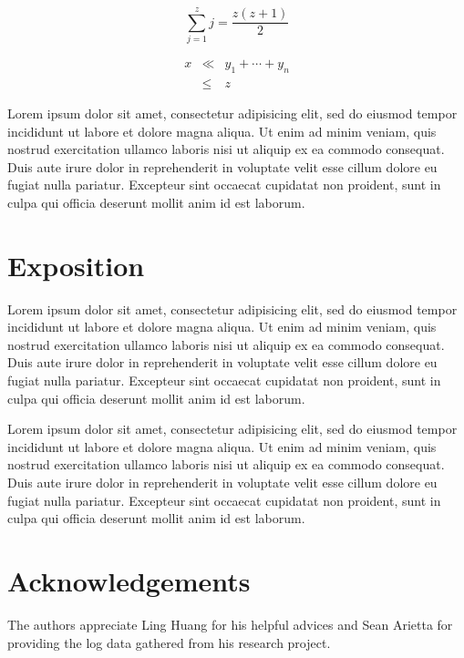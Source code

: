 \documentclass[conference]{style/acmsiggraph}
\begin{document}
\begin{equation}
 \sum_{j=1}^{z} j = \frac{z(z+1)}{2}
\end{equation}

\begin{eqnarray}
x & \ll & y_{1} + \cdots + y_{n} \\
  & \leq & z
\end{eqnarray}

Lorem ipsum dolor sit amet, consectetur adipisicing elit, sed do
eiusmod tempor incididunt ut labore et dolore magna aliqua. Ut enim ad
minim veniam, quis nostrud exercitation ullamco laboris nisi ut
aliquip ex ea commodo consequat. Duis aute irure dolor in
reprehenderit in voluptate velit esse cillum dolore eu fugiat nulla
pariatur. Excepteur sint occaecat cupidatat non proident, sunt in
culpa qui officia deserunt mollit anim id est laborum.

\section{Exposition}

Lorem ipsum dolor sit amet, consectetur adipisicing elit, sed do
eiusmod tempor incididunt ut labore et dolore magna aliqua. Ut enim ad
minim veniam, quis nostrud exercitation ullamco laboris nisi ut
aliquip ex ea commodo consequat. Duis aute irure dolor in
reprehenderit in voluptate velit esse cillum dolore eu fugiat nulla
pariatur. Excepteur sint occaecat cupidatat non proident, sunt in
culpa qui officia deserunt mollit anim id est laborum.

Lorem ipsum dolor sit amet, consectetur adipisicing elit, sed do
eiusmod tempor incididunt ut labore et dolore magna aliqua. Ut enim ad
minim veniam, quis nostrud exercitation ullamco laboris nisi ut
aliquip ex ea commodo consequat. Duis aute irure dolor in
reprehenderit in voluptate velit esse cillum dolore eu fugiat nulla
pariatur. Excepteur sint occaecat cupidatat non proident, sunt in
culpa qui officia deserunt mollit anim id est laborum.

\section*{Acknowledgements}
The authors appreciate Ling Huang for his helpful advices and Sean Arietta for providing the log
data gathered from his research project.




\end{document}
